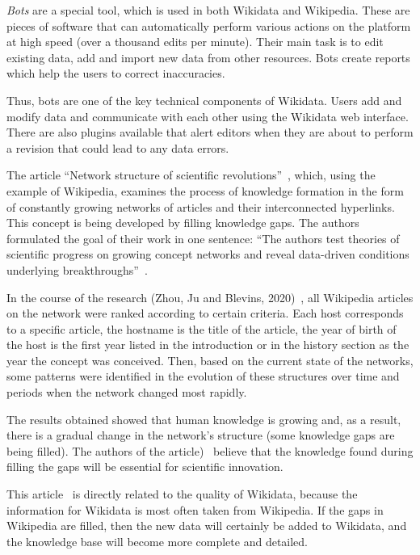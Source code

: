 \textit{Bots} are a special tool, which is used in both Wikidata and Wikipedia. These are pieces of software that can automatically perform various actions on the platform at high speed (over a thousand edits per minute). Their main task is to edit existing data, add and import new data from other resources. Bots create reports which help the users to correct inaccuracies.

Thus, bots are one of the key technical components of Wikidata. Users add and modify data and communicate with each other using the Wikidata web interface. There are also plugins available that alert editors when they are about to perform a revision that could lead to any data errors.

The article ``Network structure of scientific revolutions''~, which, using the example of Wikipedia, examines the process of knowledge formation in the form of constantly growing networks of articles and their interconnected hyperlinks. This concept is being developed by filling knowledge gaps. The authors formulated the goal of their work in one sentence: ``The authors test theories of scientific progress on growing concept networks and reveal data-driven conditions underlying breakthroughs''~.

In the course of the research (Zhou, Ju and Blevins, 2020)~, all Wikipedia articles on the network were ranked according to certain criteria. Each host corresponds to a specific article, the hostname is the title of the article, the year of birth of the host is the first year listed in the introduction or in the history section as the year the concept was conceived. Then, based on the current state of the networks, some patterns were identified in the evolution of these structures over time and periods when the network changed most rapidly.

The results obtained showed that human knowledge is growing and, as a result, there is a gradual change in the network's structure (some knowledge gaps are being filled). The authors of the article)~ believe that the knowledge found during filling the gaps will be essential for scientific innovation.

This article~ is directly related to the quality of Wikidata, because the information for Wikidata is most often taken from Wikipedia. If the gaps in Wikipedia are filled, then the new data will certainly be added to Wikidata, and the knowledge base will become more complete and detailed.